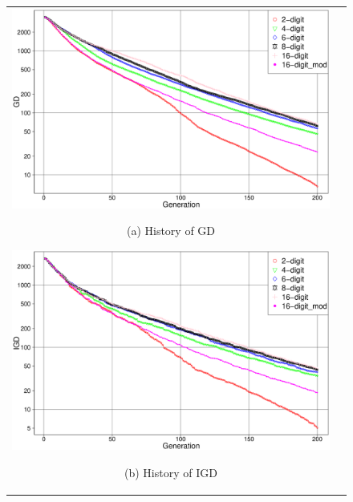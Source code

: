 \documentclass[../main/main]{subfiles}
\begin{document}
\begin{description}
\begin{figure}[htbp]
\begin{tabular}{cc}
\begin{minipage}{0.32\hsize}
\includegraphics[width=1\linewidth]{../figures/DTLZ3_modified_GD.eps}
\begin{center}
{\footnotesize (a) History of GD}
\end{center}
\end{minipage}
\begin{minipage}{0.32\hsize}
\includegraphics[width=1\linewidth]{../figures/DTLZ3_modified_IGD.eps}
\begin{center}
{\footnotesize (b) History of IGD}
\end{center}
\end{minipage}
\begin{minipage}{0.32\hsize}

\end{minipage}
\end{tabular}
\end{figure}
\end{description}
\end{document}
